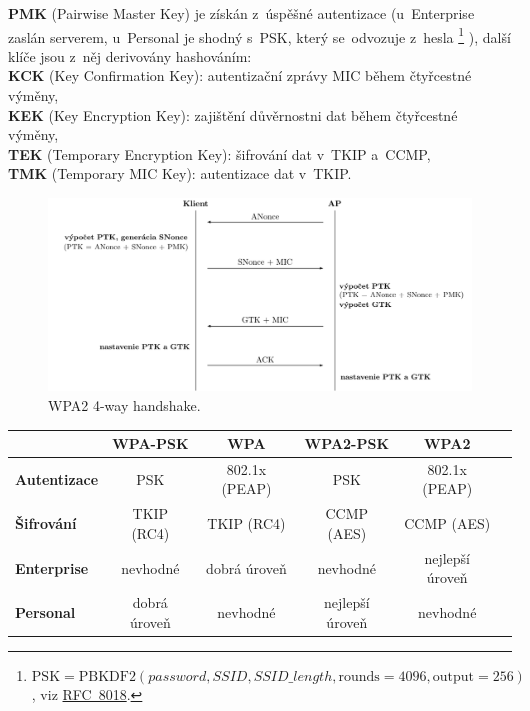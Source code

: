 \vspace*{1em}\noindent
\textbf{PMK} (Pairwise Master Key) je získán z~úspěšné autentizace (u~Enterprise zaslán serverem, u~Personal je shodný s~PSK, který se~odvozuje z~hesla%
\footnote{$\mathrm{PSK} = \mathrm{PBKDF2}(password, SSID, SSID\_length, \mathrm{rounds}=4096, \mathrm{output}=256)$, viz \href{https://datatracker.ietf.org/doc/html/rfc8018}{RFC~8018}.}%
), další klíče jsou z~něj derivovány hashováním: \\
\textbf{KCK} (Key Confirmation Key): autentizační zprávy MIC během čtyřcestné výměny, \\
\textbf{KEK} (Key Encryption Key): zajištění důvěrnostni dat během čtyřcestné výměny, \\
\textbf{TEK} (Temporary Encryption Key): šifrování dat v~TKIP a~CCMP, \\
\textbf{TMK} (Temporary MIC Key): autentizace dat v~TKIP.

\begin{figure}[ht]
    \centering
    \includegraphics[width=\textwidth]{images/wpa2_4way.pdf}
    \caption{WPA2 4-way handshake.}
    \label{fig:4_way_handshake}
\end{figure}

\begin{table}[ht]
    \centering
    \begin{tabular}{l|ccccc}
                             & \textbf{WPA-PSK} & \textbf{WPA}  & \textbf{WPA2-PSK} & \textbf{WPA2}   \\
        \hline
        \textbf{Autentizace} & PSK              & 802.1x (PEAP) & PSK               & 802.1x (PEAP)   \\
        \textbf{Šifrování}   & TKIP (RC4)       & TKIP (RC4)    & CCMP (AES)        & CCMP (AES)      \\
        \textbf{Enterprise}  & nevhodné         & dobrá úroveň  & nevhodné          & nejlepší úroveň \\
        \textbf{Personal}    & dobrá úroveň     & nevhodné      & nejlepší úroveň   & nevhodné        \\
    \end{tabular}
\end{table}


